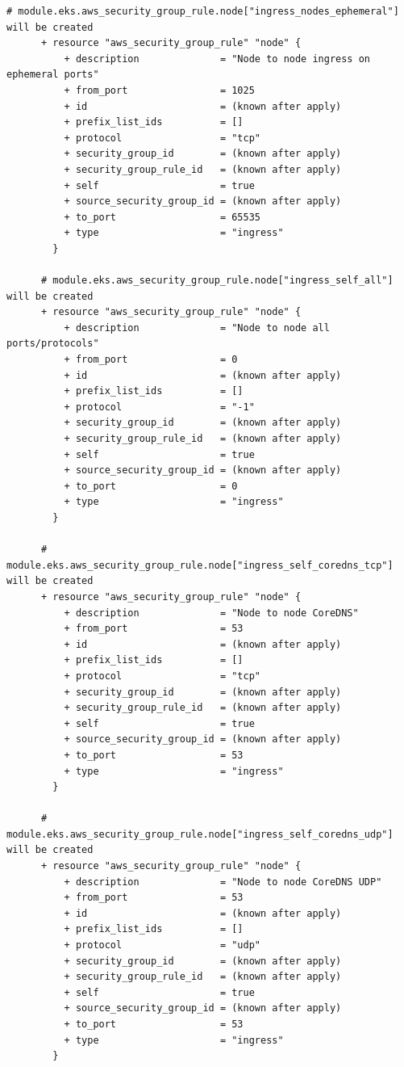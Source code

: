 \begin{lstlisting}[caption={terraform plan output for \texttt{cloudkube} provisioning}, breaklines=true, breakatwhitespace=false]
      # module.eks.aws_security_group_rule.node["ingress_nodes_ephemeral"] will be created
      + resource "aws_security_group_rule" "node" {
          + description              = "Node to node ingress on ephemeral ports"
          + from_port                = 1025
          + id                       = (known after apply)
          + prefix_list_ids          = []
          + protocol                 = "tcp"
          + security_group_id        = (known after apply)
          + security_group_rule_id   = (known after apply)
          + self                     = true
          + source_security_group_id = (known after apply)
          + to_port                  = 65535
          + type                     = "ingress"
        }
    
      # module.eks.aws_security_group_rule.node["ingress_self_all"] will be created
      + resource "aws_security_group_rule" "node" {
          + description              = "Node to node all ports/protocols"
          + from_port                = 0
          + id                       = (known after apply)
          + prefix_list_ids          = []
          + protocol                 = "-1"
          + security_group_id        = (known after apply)
          + security_group_rule_id   = (known after apply)
          + self                     = true
          + source_security_group_id = (known after apply)
          + to_port                  = 0
          + type                     = "ingress"
        }
    
      # module.eks.aws_security_group_rule.node["ingress_self_coredns_tcp"] will be created
      + resource "aws_security_group_rule" "node" {
          + description              = "Node to node CoreDNS"
          + from_port                = 53
          + id                       = (known after apply)
          + prefix_list_ids          = []
          + protocol                 = "tcp"
          + security_group_id        = (known after apply)
          + security_group_rule_id   = (known after apply)
          + self                     = true
          + source_security_group_id = (known after apply)
          + to_port                  = 53
          + type                     = "ingress"
        }
    
      # module.eks.aws_security_group_rule.node["ingress_self_coredns_udp"] will be created
      + resource "aws_security_group_rule" "node" {
          + description              = "Node to node CoreDNS UDP"
          + from_port                = 53
          + id                       = (known after apply)
          + prefix_list_ids          = []
          + protocol                 = "udp"
          + security_group_id        = (known after apply)
          + security_group_rule_id   = (known after apply)
          + self                     = true
          + source_security_group_id = (known after apply)
          + to_port                  = 53
          + type                     = "ingress"
        }
    

\end{lstlisting}
